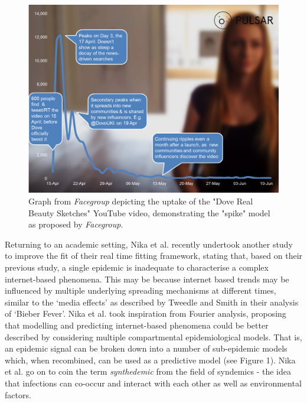 \begin{figure}[ht!]
\centering
\includegraphics[width=120mm]{facegroup.png}
\caption{Graph from \emph{Facegroup} depicting the uptake of the "Dove Real Beauty Sketches" YouTube video, demonstrating the "spike" model as proposed by \emph{Facegroup}.\cite{facegroup}}
\label{sir}
\end{figure}
\newpage
Returning to an academic setting, Nika et al. recently undertook
another study to improve the fit of their real time fitting framework,
stating that, based on their previous study, a single epidemic is
inadequate to characterise a complex internet-based phenomena. This
may be because internet based trends may be influenced by multiple
underlying spreading mechanisms at different times, similar to the
`media effects' as described by Tweedle and Smith in their analysis of
`Bieber Fever'. Nika et al. took inspiration from Fourier analysis,
proposing that modelling and predicting internet-based phenomena could
be better described by considering multiple compartmental
epidemiological models. That is, an epidemic signal can be broken down
into a number of sub-epidemic models which, when recombined, can be
used as a predictive model (see Figure 1). Nika et al. go on to coin
the term \emph{synthedemic} from the field of syndemics - the idea
that infections can co-occur and interact with each other as well as
environmental factors. 

